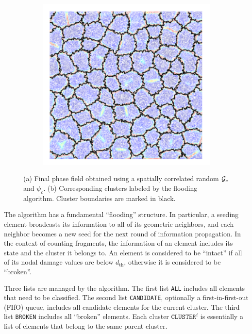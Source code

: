 \begin{figure}[htb!]
\begin{subfigure}[b]{0.36\textwidth}
    \includegraphics[width=\textwidth]{Appendices/figures/cluster.png}
    \vspace{-0.06in}
    \caption{}
  \end{subfigure}
  \caption{ (a) Final phase field obtained using a spatially correlated random ${\mathcal{G}_c}$ and $\psi_c$. (b) Corresponding clusters labeled by the flooding algorithm. Cluster boundaries are marked in black. }
  \label{fig: clustering}
\end{figure}

The algorithm has a fundamental ``flooding'' structure.  In particular, a seeding element broadcasts its information to all of its geometric neighbors, and each neighbor becomes a new seed for the next round of information propagation. In the context of counting fragments, the information of an element includes its state and the cluster it belongs to. An element is considered to be ``intact'' if all of its nodal damage values are below $d_{\text{th}}$, otherwise it is considered to be ``broken''.

Three lists are managed by the algorithm. The first list \texttt{ALL} includes all elements that need to be classified. The second list \texttt{CANDIDATE}, optionally a first-in-first-out (FIfO) queue, includes all candidate elements for the current cluster. The third list \texttt{BROKEN} includes all ``broken'' elements. Each cluster $\texttt{CLUSTER}^i$ is essentially a list of elements that belong to the same parent cluster.

